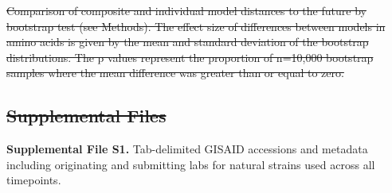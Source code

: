 \documentclass[9pt,lineno]{elife} %
\providecommand{\DIFdel}[1]{{\protect\color{red}\sout{#1}}}                      %
\providecommand{\DIFdelend}{} %
\providecommand{\DIFdelFL}[1]{\DIFdel{#1}} %
\providecommand{\DIFdeltex}[1]{{\protect\color{red}\sout{#1}}}                      %
\providecommand{\DIFdelend}{} %
\providecommand{\DIFdelFL}[1]{\DIFdel{#1}} %
\providecommand{\DIFdel}[1]{\texorpdfstring{\DIFdeltex{#1}}{}} %
\DeclareRobustCommand{\DIFdelend}{\DIFOaddend \let\includegraphics\DIFOincludegraphics} %
\begin{document}
{%
\DIFdelFL{Comparison of composite and individual model distances to the future by bootstrap test (see Methods).
      The effect size of differences between models in amino acids is given by the mean and standard deviation of the bootstrap distributions.
      The p values represent the proportion of n=10,000 bootstrap samples where the mean difference was greater than or equal to zero.
    }}

\subsection*{\DIFdel{Supplemental Files}}

\DIFdelend \textbf{Supplemental File S1.} Tab-delimited GISAID accessions and metadata including originating and submitting labs for natural strains used across all timepoints.
\end{document}
